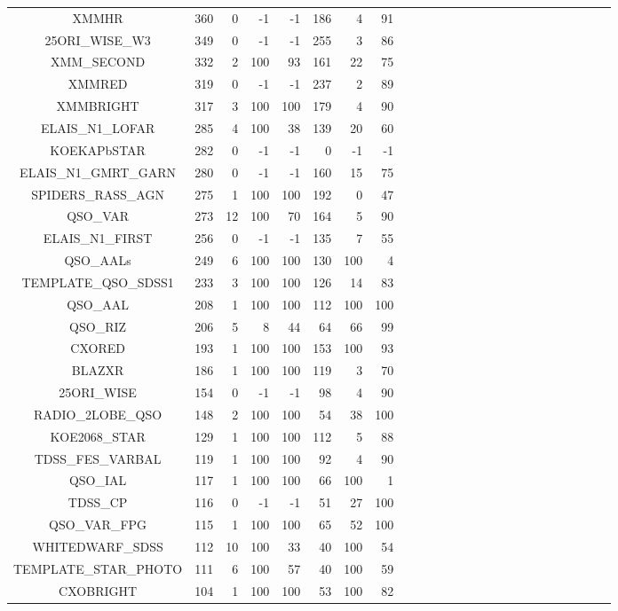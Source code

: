 \documentclass[onecolumn]{aa}
\begin{document}
\begin{center}
\begin{longtable}{c r rrrr rrrr rrrrr rrrrr rrrrr}
XMMHR                    & 360    & 0    & -1  & -1  & 186    & 4 & 91    \\
25ORI\_WISE\_W3          & 349    & 0    & -1  & -1  & 255    & 3 & 86    \\
XMM\_SECOND              & 332    & 2    & 100 & 93  & 161    & 22 & 75   \\
XMMRED                   & 319    & 0    & -1  & -1  & 237    & 2 & 89    \\
XMMBRIGHT                & 317    & 3    & 100 & 100 & 179    & 4 & 90    \\
ELAIS\_N1\_LOFAR         & 285    & 4    & 100 & 38  & 139    & 20 & 60   \\
KOEKAPbSTAR              & 282    & 0    & -1  & -1  & 0      & -1  & -1  \\
ELAIS\_N1\_GMRT\_GARN    & 280    & 0    & -1  & -1  & 160    & 15 & 75   \\
SPIDERS\_RASS\_AGN       & 275    & 1    & 100 & 100 & 192    & 0 & 47    \\
QSO\_VAR                 & 273    & 12   & 100 & 70  & 164    & 5 & 90    \\
ELAIS\_N1\_FIRST         & 256    & 0    & -1  & -1  & 135    & 7 & 55    \\
QSO\_AALs                & 249    & 6    & 100 & 100 & 130    & 100 & 4   \\
TEMPLATE\_QSO\_SDSS1     & 233    & 3    & 100 & 100 & 126    & 14 & 83   \\
QSO\_AAL                 & 208    & 1    & 100 & 100 & 112    & 100 & 100 \\
QSO\_RIZ                 & 206    & 5    & 8   & 44  & 64     & 66 & 99   \\
CXORED                   & 193    & 1    & 100 & 100 & 153    & 100 & 93  \\
BLAZXR                   & 186    & 1    & 100 & 100 & 119    & 3 & 70    \\
25ORI\_WISE              & 154    & 0    & -1  & -1  & 98     & 4 & 90    \\
RADIO\_2LOBE\_QSO        & 148    & 2    & 100 & 100 & 54     & 38 & 100  \\
KOE2068\_STAR            & 129    & 1    & 100 & 100 & 112    & 5 & 88    \\
TDSS\_FES\_VARBAL        & 119    & 1    & 100 & 100 & 92     & 4 & 90    \\
QSO\_IAL                 & 117    & 1    & 100 & 100 & 66     & 100 & 1   \\
TDSS\_CP                 & 116    & 0    & -1  & -1  & 51     & 27 & 100  \\
QSO\_VAR\_FPG            & 115    & 1    & 100 & 100 & 65     & 52 & 100  \\
WHITEDWARF\_SDSS         & 112    & 10   & 100 & 33  & 40     & 100 & 54  \\
TEMPLATE\_STAR\_PHOTO    & 111    & 6    & 100 & 57  & 40     & 100 & 59  \\
CXOBRIGHT                & 104    & 1    & 100 & 100 & 53     & 100 & 82  \\


\end{longtable}
\end{center}
\end{document}
